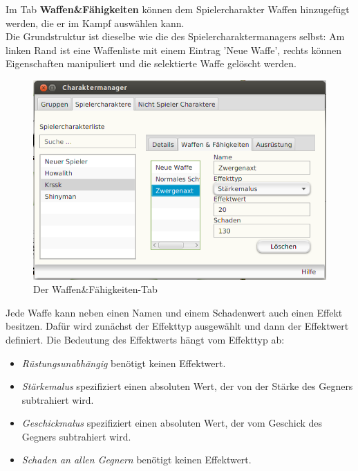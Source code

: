 \documentclass[11pt, a4paper, german]{article}
\begin{document}
Im Tab \textbf{Waffen\&Fähigkeiten} können dem Spielercharakter Waffen hinzugefügt werden, die er im Kampf auswählen kann. \\
Die Grundstruktur ist dieselbe wie die des Spielercharaktermanagers selbst: Am linken Rand ist eine Waffenliste mit einem Eintrag 'Neue Waffe', rechts können Eigenschaften manipuliert und die selektierte Waffe gelöscht werden.
\begin{figure}[h]
\centering
\includegraphics[width=1\linewidth]{Bilder/Spielercharaktermanager2}
\caption{Der Waffen\&Fähigkeiten-Tab}
\label{fig:Spielercharaktermanager2}
\end{figure}

Jede Waffe kann neben einen Namen und einem Schadenwert auch einen Effekt besitzen. Dafür wird zunächst der Effekttyp ausgewählt und dann der Effektwert definiert. Die Bedeutung des Effektwerts hängt vom Effekttyp ab: \begin{itemize}
\item[] \textit{Rüstungsunabhängig} benötigt keinen Effektwert.
\item[] \textit{Stärkemalus} spezifiziert einen absoluten Wert, der von der Stärke des Gegners subtrahiert wird.
\item[] \textit{Geschickmalus} spezifiziert einen absoluten Wert, der vom Geschick des Gegners subtrahiert wird.
\item[] \textit{Schaden an allen Gegnern} benötigt keinen Effektwert.
\end{itemize}
\end{document}
